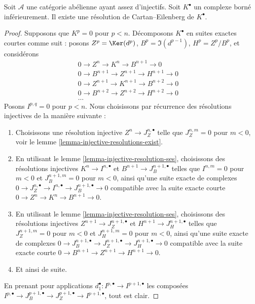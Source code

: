 \begin{lemma}
\label{lemma-cartan-eilenberg}
Soit $\mathcal{A}$ une catégorie abélienne ayant assez d'injectifs.
Soit $K^\bullet$ un complexe borné inférieurement.
Il existe une résolution de Cartan--Eilenberg de $K^\bullet$.
\end{lemma}

\begin{proof}
Supposons que $K^p = 0$ pour $p < n$. Décomposons $K^\bullet$ en suites
exactes courtes comme suit : posons $Z^p = \Ker(d^p)$,
$B^p = \Im(d^{p - 1})$, $H^p = Z^p/B^p$, et considérons
$$
\begin{matrix}
0 \to Z^n \to K^n \to B^{n + 1} \to 0 \\
0 \to B^{n + 1} \to Z^{n + 1} \to H^{n + 1} \to 0 \\
0 \to Z^{n + 1} \to K^{n + 1} \to B^{n + 2} \to 0 \\
0 \to B^{n + 2} \to Z^{n + 2} \to H^{n + 2} \to 0 \\
\ldots
\end{matrix}
$$
Posons $I^{p, q} = 0$ pour $p < n$. Nous choisissons par récurrence des
résolutions injectives de la manière suivante :
\begin{enumerate}
\item Choisissons une résolution injective
$Z^n \to J_Z^{n, \bullet}$ telle que $J_Z^{n, m} = 0$ pour $m < 0$, voir le
lemme \ref{lemma-injective-resolutions-exist}.
\item En utilisant le lemme \ref{lemma-injective-resolution-ses}, choisissons
des résolutions injectives $K^n \to I^{n, \bullet}$ et
$B^{n + 1} \to J_B^{n + 1, \bullet}$ telles que $I^{n, m} = 0$ pour $m < 0$
et $J_B^{n + 1, m} = 0$ pour $m < 0$, ainsi qu'une suite exacte de complexes
$0 \to J_Z^{n, \bullet} \to I^{n, \bullet} \to J_B^{n + 1, \bullet} \to 0$
compatible avec la suite exacte courte
$0 \to Z^n \to K^n \to B^{n + 1} \to 0$.
\item En utilisant le lemme \ref{lemma-injective-resolution-ses}, choisissons
des résolutions injectives $Z^{n + 1} \to J_Z^{n + 1, \bullet}$ et
$H^{n + 1} \to J_H^{n + 1, \bullet}$ telles que
$J_Z^{n + 1, m} = 0$ pour $m < 0$ et $J_H^{n + 1, m} = 0$ pour $m < 0$,
ainsi qu'une suite exacte de complexes
$0 \to J_B^{n + 1, \bullet} \to J_Z^{n + 1, \bullet}
\to J_H^{n + 1, \bullet} \to 0$ compatible avec la suite exacte courte
$0 \to B^{n + 1} \to Z^{n + 1} \to H^{n + 1} \to 0$.
\item Et ainsi de suite.
\end{enumerate}
En prenant pour applications
$d_1^\bullet : I^{p, \bullet} \to I^{p + 1, \bullet}$ les composées
$I^{p, \bullet} \to J_B^{p + 1, \bullet} \to
J_Z^{p + 1, \bullet} \to I^{p + 1, \bullet}$, tout est clair.
\end{proof}

